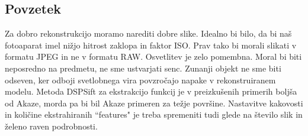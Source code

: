 
    \subsection{Povzetek}
        Za dobro rekonstrukcijo moramo narediti dobre slike. Idealno bi bilo, da bi naš fotoaparat imel nižjo hitrost zaklopa in faktor ISO. Prav tako bi morali slikati v formatu JPEG in ne v formatu RAW. Osvetlitev je zelo pomembna. Moral bi biti neposredno na predmetu, ne sme ustvarjati senc. Zunanji objekt ne sme biti odseven, ker odboji svetlobnega vira povzročajo napake v rekonstruiranem modelu. Metoda DSPSift za ekstrakcijo funkcij je v preizkušenih primerih boljša od Akaze, morda pa bi bil Akaze primeren za težje površine. Nastavitve kakovosti in količine ekstrahiranih ``features" je treba spremeniti tudi glede na število slik in želeno raven podrobnosti.